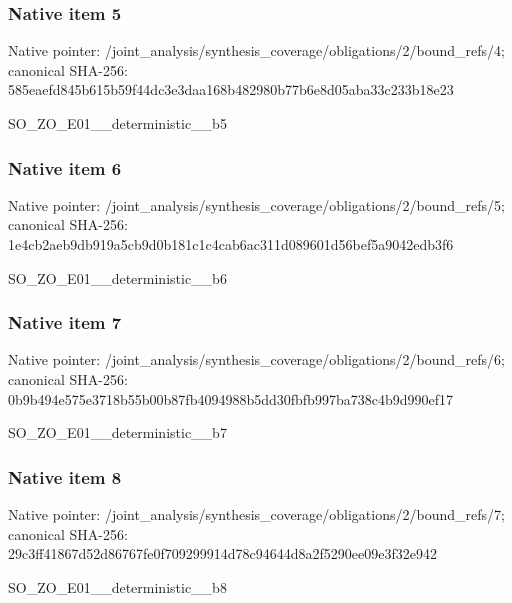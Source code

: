 \documentclass[10pt,a4paper]{article}
\begin{document}
\subsubsection{Native item 5}
Native pointer: /joint\_\allowbreak{}analysis/synthesis\_\allowbreak{}coverage/obligations/2/bound\_\allowbreak{}refs/4; canonical SHA-256: 585eaefd845b615b59f44dc3e3daa168b482980b77b6e8d05aba33c233b18e23

\begingroup\raggedright\sloppy SO\_\allowbreak{}ZO\_\allowbreak{}E01\_\allowbreak{}\_\allowbreak{}deterministic\_\allowbreak{}\_\allowbreak{}b5\par\endgroup

\subsubsection{Native item 6}
Native pointer: /joint\_\allowbreak{}analysis/synthesis\_\allowbreak{}coverage/obligations/2/bound\_\allowbreak{}refs/5; canonical SHA-256: 1e4cb2aeb9db919a5cb9d0b181c1c4cab6ac311d089601d56bef5a9042edb3f6

\begingroup\raggedright\sloppy SO\_\allowbreak{}ZO\_\allowbreak{}E01\_\allowbreak{}\_\allowbreak{}deterministic\_\allowbreak{}\_\allowbreak{}b6\par\endgroup

\subsubsection{Native item 7}
Native pointer: /joint\_\allowbreak{}analysis/synthesis\_\allowbreak{}coverage/obligations/2/bound\_\allowbreak{}refs/6; canonical SHA-256: 0b9b494e575e3718b55b00b87fb4094988b5dd30fbfb997ba738c4b9d990ef17

\begingroup\raggedright\sloppy SO\_\allowbreak{}ZO\_\allowbreak{}E01\_\allowbreak{}\_\allowbreak{}deterministic\_\allowbreak{}\_\allowbreak{}b7\par\endgroup

\subsubsection{Native item 8}
Native pointer: /joint\_\allowbreak{}analysis/synthesis\_\allowbreak{}coverage/obligations/2/bound\_\allowbreak{}refs/7; canonical SHA-256: 29c3ff41867d52d86767fe0f709299914d78c94644d8a2f5290ee09e3f32e942

\begingroup\raggedright\sloppy SO\_\allowbreak{}ZO\_\allowbreak{}E01\_\allowbreak{}\_\allowbreak{}deterministic\_\allowbreak{}\_\allowbreak{}b8\par\endgroup
\end{document}
